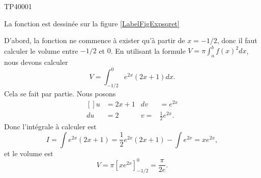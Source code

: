 \begin{corrige}{TP40001}

La fonction est dessinée sur la figure \ref{LabelFigExpsqret}                                                                                 
\newcommand{\CaptionFigExpsqret}{La fonction de l'exercice \ref{exoTP40001}}                                                                 
 
D'abord, la fonction ne commence à exister qu'à partir de $x=-1/2$, donc il faut calculer le volume entre $-1/2$ et $0$. En utilisant la formule $V=\pi\int_a^bf(x)^2dx$, nous devons calculer
\begin{equation}
	V=\int_{-1/2}^0 e^{2x}(2x+1)dx.
\end{equation}
Cela se fait par partie. Nous posons
\begin{equation}
	\begin{aligned}[]
		u&=2x+1	&dv&= e^{2x}\\
		du&=2	&v=&\frac{1}{ 2 } e^{2x}.
	\end{aligned}
\end{equation}
Donc l'intégrale à calculer est
\begin{equation}
	I=\int e^{2x}(2x+1)=\frac{1}{ 2 } e^{2x}(2x+1)-\int  e^{2x}=x e^{2x},
\end{equation}
et le volume est
\begin{equation}
	V=\pi[x e^{2x}]_{-1/2}^0=\frac{ \pi }{ 2e }.
\end{equation}


\end{corrige}
